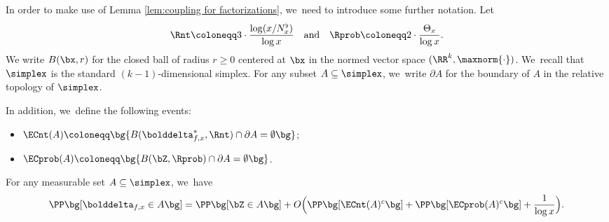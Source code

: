 In order to make use of Lemma \ref{lem:coupling for factorizations}, we~need to introduce some further notation. Let
\[
\Rnt \coloneqq 3\cdot \frac{\log(x/N_x^\flat)}{\log x} \quad \text{and} \quad \Rprob \coloneqq 2\cdot \frac{\Theta_x}{\log x}.
\]
We write $B(\bx,r)$ for the closed ball of radius $r \ge 0$ centered at $\bx$ in the normed vector space $(\RR^k, \maxnorm{\cdot})$. We~recall that $\simplex$ is the standard $(k-1)$-dimensional simplex. For any subset $A \subseteq \simplex$, we~write $\partial A$ for the boundary of $A$ in the relative topology of $\simplex$.

In addition, we~define the following events:
\begin{itemize}
\item $\ECnt(A) \coloneqq \bg\{ B(\bolddelta_{f, x}^*, \Rnt)\cap \partial A=\emptyset\bg\}$;

\item $\ECprob(A) \coloneqq \bg\{ B(\bZ, \Rprob) \cap \partial A = \emptyset \bg\}$.
\end{itemize}

\begin{lem}
\label{lem:sym diff D and Z}
For any measurable set $A\subseteq\simplex$, we~have
\[
\PP\bg[\bolddelta_{f, x} \in A\bg] = \PP\bg[\bZ \in A\bg] + O\Bigl(\PP\bg[\ECnt(A)^c\bg] + \PP\bg[\ECprob(A)^c\bg] + \frac{1}{\log x}\Bigr).
\]
\end{lem}

